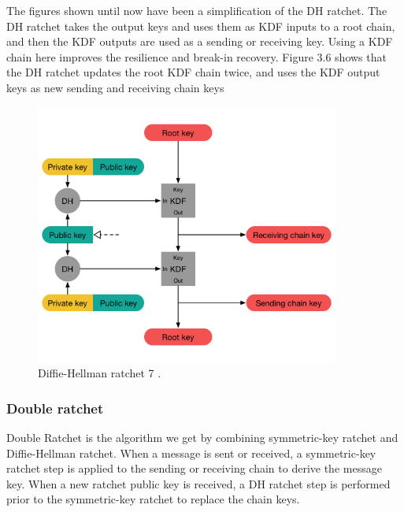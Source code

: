 The figures shown until now have been a simplification of the DH
ratchet. The DH ratchet takes the output keys and uses them as KDF inputs
to a root chain, and then the KDF outputs are used as a sending or receiving
key. Using a KDF chain here improves the resilience and break-in recovery.
Figure 3.6 shows that the DH ratchet updates the root KDF chain twice, and
uses the KDF output keys as new sending and receiving chain keys


\begin{figure}[H]
	\centering
	\includegraphics[width=10cm]{figures/dhratchet7.png}
	\caption{Diffie-Hellman ratchet 7 \cite{doubleratchet}.}
	\label{fig:dhratchet7}
\end{figure}

\subsubsection{Double ratchet}
Double Ratchet is the algorithm we get by combining symmetric-key
ratchet and Diffie-Hellman ratchet. 
When a message is sent or received, a symmetric-key ratchet step is
applied to the sending or receiving chain to derive the message key.
When a new ratchet public key is received, a DH ratchet step is performed prior to the symmetric-key ratchet to replace the chain keys.

